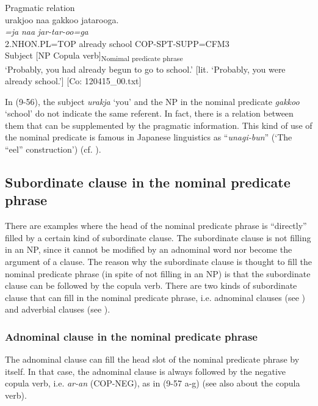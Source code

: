 \ea   Pragmatic relation \label{ex:9.56}\\
 \gllll  urakjoo  naa  gakkoo  jatarooga.\\
    \textit{=ja}  \textit{naa}  \textit{}  \textit{jar-tar-oo=ga}\\
    2.NHON.PL=TOP  already  school  COP-SPT-SUPP=CFM3\\
    Subject    [NP  Copula verb]\textsubscript{Nomimal predicate phrase}\\
    \glt     ‘Probably, you had already begun to go to school.’ [lit. ‘Probably, you were already school.’] [Co: 120415\_00.txt]
\z

In (9-56), the subject \textit{urakja} ‘you’ and the NP in the nominal predicate \textit{gakkoo} ‘school’ do not indicate the same referent. In fact, there is a relation between them that can be supplemented by the pragmatic information. This kind of use of the nominal predicate is famous in Japanese linguistics as “\textit{unagi-bun}” (‘The “eel” construction’) (cf. \citealt{Okutsu1978}).

\subsection{Subordinate clause in the nominal predicate phrase}\label{sec:9.3.2}

There are examples where the head of the nominal predicate phrase is “directly” filled by a certain kind of subordinate clause. The subordinate clause is not filling in an NP, since it cannot be modified by an adnominal word nor become the argument of a clause. The reason why the subordinate clause is thought to fill the nominal predicate phrase (in spite of not filling in an NP) is that the subordinate clause can be followed by the copula verb. There are two kinds of subordinate clause that can fill in the nominal predicate phrase, i.e. adnominal clauses (see ) and adverbial clauses (see ).

\subsubsection{Adnominal clause in the nominal predicate phrase}\label{sec:9.3.2.1}

The adnominal clause can fill the head slot of the nominal predicate phrase by itself. In that case, the adnominal clause is always followed by the negative copula verb, i.e. \textit{ar-an} (COP-NEG), as in (9-57 a-g) (see also  about the copula verb).

